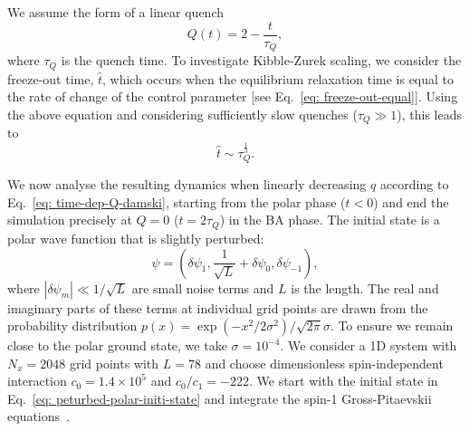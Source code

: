 We assume the form of a linear quench
\begin{equation}
    Q(t) = 2 - \frac{t}{\tau_Q},
    \label{eq: time-dep-Q-damski}
\end{equation}
where \( \tau_Q \) is the quench time.
To investigate Kibble-Zurek scaling, we consider the freeze-out time,
\( \hat{t} \), which occurs when the equilibrium relaxation time is equal to the
rate of change of the control parameter [see Eq.~\eqref{eq: freeze-out-equal}].
Using the above equation and considering sufficiently slow quenches
(\(\tau_Q \gg 1\)), this leads to
\begin{equation}
    \hat{t} \sim \tau_Q^{\frac{1}{3}}.
\end{equation}

We now analyse the resulting dynamics when linearly decreasing \( q \) according
to Eq.~\eqref{eq: time-dep-Q-damski}, starting from the polar phase (\(t < 0\))
and end the simulation precisely at \( Q = 0 \) (\( t=2\tau_Q \)) in the BA
phase.
The initial state is a polar wave function that is slightly perturbed:
\begin{equation}
    \psi = \left(\delta\psi_1, \frac{1}{\sqrt{L}} + \delta\psi_0,
    \delta\psi_{-1}\right),
    \label{eq: peturbed-polar-initi-state}
\end{equation}
where \( |\delta\psi_m| \ll 1 / \sqrt{L} \) are small noise terms and \( L \) is
the length.
The real and imaginary parts of these terms at individual grid points are drawn
from the probability distribution
\( p(x) = \exp(-x^2/2\sigma^2)/\sqrt{2\pi}\sigma \).
To ensure we remain close to the polar ground state, we take
\( \sigma=10^{-4} \).
We consider a 1D system with \(N_x = 2048\) grid points with \(L=78\) and
choose dimensionless spin-independent interaction \(c_0=1.4\times10^5\) and
\(c_0/c_1 = -222\).
We start with the initial state in Eq.~\eqref{eq: peturbed-polar-initi-state}
and integrate the spin-1 Gross-Pitaevskii equations~\cite{Symes2016}.

